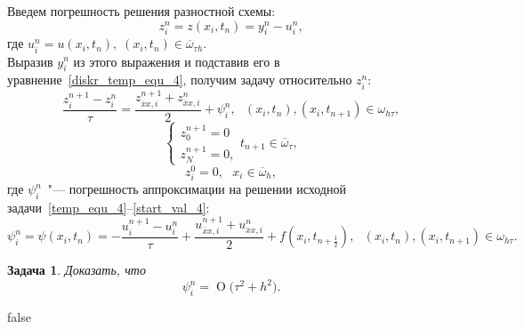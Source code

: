 \documentclass[11pt,a4paper,twoside,listtotoc,bibtotoc]{report}
\numberwithin{equation}{section}
\newtheorem*{problem}{Задача}
\theoremstyle{definition}
\theoremstyle{plain}
\newcommand{\bigO}[1]{\ensuremath{\operatorname{O}\bigl(#1\bigr)}}
\begin{document}
Введем погрешность решения разностной схемы:
%
$$
    z_i^n = z(x_i, t_n) = y_i^n - u_i^n,
$$
%
где $u_i^n = u(x_i, t_n),\;(x_i, t_n) \in \overline{\omega}_{\tau h}.$\\
Выразив $y_i^n$ из этого выражения и подставив его в уравнение~\eqref{diskr_temp_equ_4},
получим задачу относительно $z_i^n$:
\begin{equation}
    \label{z_eq_4}
    \frac{z_i^{n+1} - z_i^n}{\tau} = \frac{z^{n+1}_{\overline{x}x,i} +
    z^{n}_{\overline{x}x,i}}{2} + \psi_i^n,~~~(x_i, t_n), (x_i, t_{n+1})\in \omega_{h\tau},
\end{equation}
%
\begin{equation}
    \label{z_board_4}
    \begin{cases}
        z_0^{n+1} = 0 \\
        z_N^{n+1} = 0,
    \end{cases}
    t_{n+1}\in \overline{\omega}_{\tau},
\end{equation}
%
\begin{equation}
    \label{z_start_4}
    z_i^0 = 0,~~~x_i\in \overline{\omega}_h,
\end{equation}
%
где $\psi_i^n$~"--- погрешность аппроксимации на решении исходной
задачи~\eqref{temp_equ_4}--\eqref{start_val_4}:
%
\begin{equation}
%
    \label{approx_temp_4}
    \psi_i^n = \psi(x_i, t_n) = -\frac{u_i^{n+1} - u_i^n}{\tau} + \frac{u^{n+1}_{\overline{x}x,i}
    + u^{n}_{\overline{x}x,i}}{2} + f(x_i, t_{n+\frac{1}{2}}),
    ~~~(x_i, t_n), (x_i, t_{n+1})\in \omega_{h\tau}.
%
\end{equation}
%
\begin{problem}
%
    Доказать, что
    \begin{equation}
        \label{eq:problemeq2}
        \psi_i^n = \bigO{\tau^2 + h^2}.
    \end{equation}
%
\end{problem}
%
\ifx false
%
\end{document}
